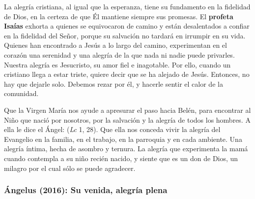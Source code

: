 \begin{body}
					La alegría cristiana, al igual que la esperanza, tiene su fundamento en la fidelidad de Dios, en la certeza de que Él mantiene siempre sus promesas. El \textbf{profeta Isaías} exhorta a quienes se equivocaron de camino y están desalentados a confiar en la fidelidad del Señor, porque su salvación no tardará en irrumpir en su vida. Quienes han encontrado a Jesús a lo largo del camino, experimentan en el corazón una serenidad y una alegría de la que nada ni nadie puede privarles. Nuestra alegría es Jesucristo, su amor fiel e inagotable. Por ello, cuando un cristiano llega a estar triste, quiere decir que se ha alejado de Jesús. Entonces, no hay que dejarle solo. Debemos rezar por él, y hacerle sentir el calor de la comunidad.
					
					Que la Virgen María nos ayude a apresurar el paso hacia Belén, para encontrar al Niño que nació por nosotros, por la salvación y la alegría de todos los hombres. A ella le dice el Ángel:  (\emph{Lc} 1, 28). Que ella nos conceda vivir la alegría del Evangelio en la familia, en el trabajo, en la parroquia y en cada ambiente. Una alegría íntima, hecha de asombro y ternura. La alegría que experimenta la mamá cuando contempla a su niño recién nacido, y siente que es un don de Dios, un milagro por el cual sólo se puede agradecer.
				\end{body}

			\subsubsection{Ángelus (2016): Su venida, alegría plena}
			
				
